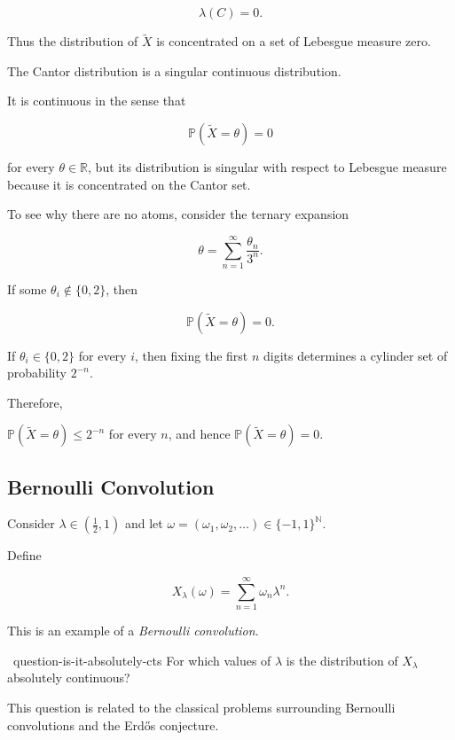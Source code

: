 \[
\lambda(C)=0.
\]

Thus the distribution of $\widetilde{X}$ is concentrated on a set of
Lebesgue measure zero.

\begin{important}
The Cantor distribution is a singular continuous distribution.

It is continuous in the sense that

\[
\mathbb{P}(\widetilde{X}=\theta)=0
\]

for every $\theta\in\mathbb{R}$, but its distribution is singular with
respect to Lebesgue measure because it is concentrated on the Cantor
set.
\end{important}

To see why there are no atoms, consider the ternary expansion

\[
\theta
=
\sum_{n=1}^{\infty}
\frac{\theta_n}{3^n}.
\]

If some $\theta_i\notin\{0,2\}$, then

\[
\mathbb{P}(\widetilde{X}=\theta)=0.
\]

If $\theta_i\in\{0,2\}$ for every $i$, then fixing the first $n$
digits determines a cylinder set of probability
\(
2^{-n}.
\)

Therefore,

\(
\mathbb{P}(\widetilde{X}=\theta)
\leq
2^{-n}
\)
for every $n$, and hence
\(
\mathbb{P}(\widetilde{X}=\theta)=0.
\)

\subsection{Bernoulli Convolution}

Consider
\(
\lambda\in\left(\frac12,1\right)
\)
and let
\(
\omega=(\omega_1,\omega_2,\ldots)
\in\{-1,1\}^{\mathbb{N}}.
\)

Define

\[
X_\lambda(\omega)
=
\sum_{n=1}^{\infty}
\omega_n\lambda^n.
\]

This is an example of a \emph{Bernoulli convolution}.

\begin{question}{~}{question-is-it-absolutely-cts}
For which values of $\lambda$ is the distribution of
$X_\lambda$ absolutely continuous?
\end{question}

This question is related to the classical problems surrounding
Bernoulli convolutions and the Erd\H{o}s conjecture.

